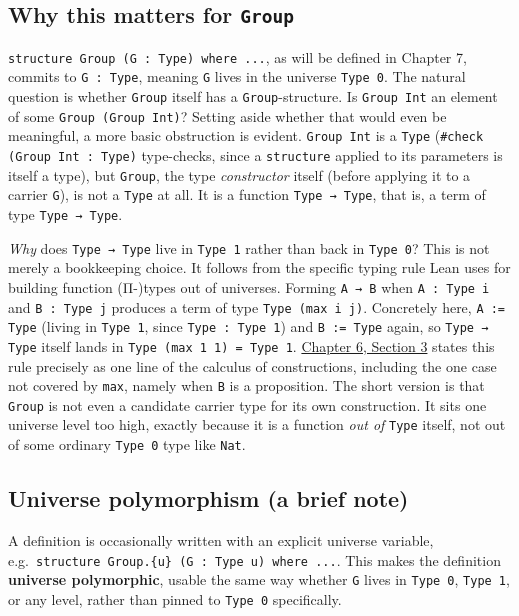 \subsection{\texorpdfstring{Why this matters for \texttt{Group}}{Why this matters for Group}}\label{sec:06-rigor-check:02-universes:3}

\texttt{structure Group (G : Type) where ...}, as will be defined in Chapter 7, commits to \texttt{G : Type}, meaning \texttt{G} lives in the universe \texttt{Type 0}. The natural question is whether \texttt{Group} itself has a \texttt{Group}-structure. Is \texttt{Group Int} an element of some \texttt{Group (Group Int)}? Setting aside whether that would even be meaningful, a more basic obstruction is evident. \texttt{Group Int} is a \texttt{Type} (\texttt{\#check (Group Int : Type)} type-checks, since a \texttt{structure} applied to its parameters is itself a type), but \texttt{Group}, the type \emph{constructor} itself (before applying it to a carrier \texttt{G}), is not a \texttt{Type} at all. It is a function \texttt{Type → Type}, that is, a term of type \texttt{Type → Type}.

\emph{Why} does \texttt{Type → Type} live in \texttt{Type 1} rather than back in \texttt{Type 0}? This is not merely a bookkeeping choice. It follows from the specific typing rule Lean uses for building function (Π-)types out of universes. Forming \texttt{A → B} when \texttt{A : Type i} and \texttt{B : Type j} produces a term of type \texttt{Type (max i j)}. Concretely here, \texttt{A := Type} (living in \texttt{Type 1}, since \texttt{Type : Type 1}) and \texttt{B := Type} again, so \texttt{Type → Type} itself lands in \texttt{Type (max 1 1) = Type 1}. \hyperref[sec:06-rigor-check:03-typing-rules-and-safety:1]{Chapter 6, Section 3} states this rule precisely as one line of the calculus of constructions, including the one case not covered by \texttt{max}, namely when \texttt{B} is a proposition. The short version is that \texttt{Group} is not even a candidate carrier type for its own construction. It sits one universe level too high, exactly because it is a function \emph{out of} \texttt{Type} itself, not out of some ordinary \texttt{Type 0} type like \texttt{Nat}.

\subsection{Universe polymorphism (a brief note)}\label{sec:06-rigor-check:02-universes:4}

A definition is occasionally written with an explicit universe variable, e.g.~\texttt{structure Group.\{u\} (G : Type u) where ...}. This makes the definition \textbf{universe polymorphic}, usable the same way whether \texttt{G} lives in \texttt{Type 0}, \texttt{Type 1}, or any level, rather than pinned to \texttt{Type 0} specifically.

